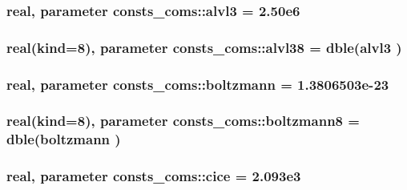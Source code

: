 \subsubsection[{\texorpdfstring{alvl3}{alvl3}}]{\setlength{\rightskip}{0pt plus 5cm}real, parameter consts\+\_\+coms\+::alvl3 = 2.\+50e6}\hypertarget{namespaceconsts__coms_a8458ca23e2c2f0ef6580474773afd4e8}{}\label{namespaceconsts__coms_a8458ca23e2c2f0ef6580474773afd4e8}
\subsubsection[{\texorpdfstring{alvl38}{alvl38}}]{\setlength{\rightskip}{0pt plus 5cm}real(kind=8), parameter consts\+\_\+coms\+::alvl38 = dble({\bf alvl3} )}\hypertarget{namespaceconsts__coms_a975fb046d5ee7ab5b6b9cef9f840808d}{}\label{namespaceconsts__coms_a975fb046d5ee7ab5b6b9cef9f840808d}
\subsubsection[{\texorpdfstring{boltzmann}{boltzmann}}]{\setlength{\rightskip}{0pt plus 5cm}real, parameter consts\+\_\+coms\+::boltzmann = 1.\+3806503e-\/23}\hypertarget{namespaceconsts__coms_afc5519d22399e9054c914e08f4b03bc5}{}\label{namespaceconsts__coms_afc5519d22399e9054c914e08f4b03bc5}
\subsubsection[{\texorpdfstring{boltzmann8}{boltzmann8}}]{\setlength{\rightskip}{0pt plus 5cm}real(kind=8), parameter consts\+\_\+coms\+::boltzmann8 = dble({\bf boltzmann} )}\hypertarget{namespaceconsts__coms_a46e0614f5166dcc3513d6447c2aa7212}{}\label{namespaceconsts__coms_a46e0614f5166dcc3513d6447c2aa7212}
\subsubsection[{\texorpdfstring{cice}{cice}}]{\setlength{\rightskip}{0pt plus 5cm}real, parameter consts\+\_\+coms\+::cice = 2.\+093e3}\hypertarget{namespaceconsts__coms_ae49393979194289765ba196f2ac2e000}{}\label{namespaceconsts__coms_ae49393979194289765ba196f2ac2e000}
